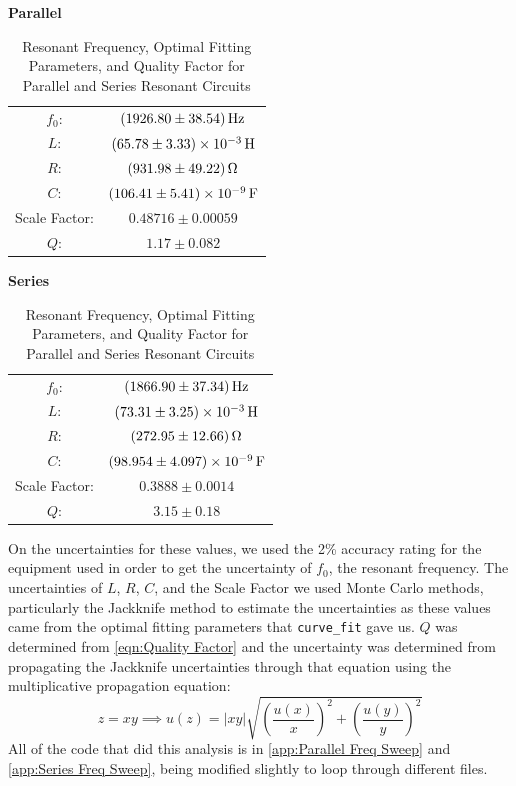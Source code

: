 \documentclass[12pt]{article}
\numberwithin{equation}{section}
\numberwithin{figure}{section}
\begin{document}
    \begin{table}[H]
        \begin{minipage}{0.5\textwidth}
            \centering
            \textbf{Parallel} \\
            \begin{tabular}{c c}
                \hline
                $f_0$: & $\SI{1926.80\pm38.54}{\hertz}$\\
                $L$: & $\SI{65.78\pm3.33e-3}{\henry}$\\
                $R$: & $\SI{931.98\pm49.22}{\ohm}$\\
                $C$: & $\SI{106.41\pm5.41e-09}{\farad}$\\
                Scale Factor: & $0.48716\pm0.00059$\\
                $Q$: & $1.17\pm0.082$
            \end{tabular}
        \end{minipage}
        \vline\;
        \begin{minipage}{0.5\textwidth}
            \centering
            \textbf{Series} \\
            \begin{tabular}{c c}
                \hline
                $f_0$: & $\SI{1866.90\pm37.34}{\hertz}$\\
                $L$: & $\SI{73.31\pm3.25e-3}{\henry}$\\
                $R$: & $\SI{272.95\pm12.66}{\ohm}$\\
                $C$: & $\SI{98.954\pm4.097e-09}{\farad}$\\
                Scale Factor: & $ 0.3888\pm0.0014$\\
                $Q$: & $3.15\pm0.18$
            \end{tabular}
        \end{minipage}
        \caption{Resonant Frequency, Optimal Fitting Parameters, and Quality Factor for Parallel and Series Resonant Circuits}
        \label{tbl:Resonant Frequency and Quality Factor}
    \end{table}
    On the uncertainties for these values, we used the 2\% accuracy rating for the equipment used 
    in order to get the uncertainty of $f_0$, the resonant frequency. The uncertainties of $L$, $R$, 
    $C$, and the Scale Factor we used Monte Carlo methods, particularly the Jackknife method to 
    estimate the uncertainties as these values came from the optimal fitting parameters that 
    \texttt{curve\_fit} gave us. $Q$ was determined from \autoref{eqn:Quality Factor} and the 
    uncertainty was determined from propagating the Jackknife uncertainties through that equation 
    using the multiplicative propagation equation:
    \begin{equation*}
        z=xy \implies u(z)=|xy|\sqrt{\left(\frac{u(x)}{x}\right)^2+\left(\frac{u(y)}{y}\right)^2}
    \end{equation*}
    All of the code that did this analysis is in \autoref{app:Parallel Freq Sweep} and 
    \autoref{app:Series Freq Sweep}, being modified slightly to loop through different files.
\end{document}
